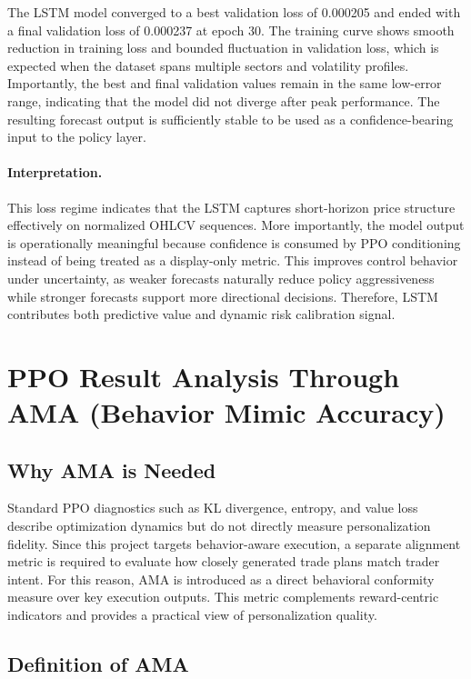 The LSTM model converged to a best validation loss of 0.000205 and ended with a final validation loss of 0.000237 at epoch 30. The training curve shows smooth reduction in training loss and bounded fluctuation in validation loss, which is expected when the dataset spans multiple sectors and volatility profiles. Importantly, the best and final validation values remain in the same low-error range, indicating that the model did not diverge after peak performance. The resulting forecast output is sufficiently stable to be used as a confidence-bearing input to the policy layer.

\paragraph{Interpretation.}
This loss regime indicates that the LSTM captures short-horizon price structure effectively on normalized OHLCV sequences. More importantly, the model output is operationally meaningful because confidence is consumed by PPO conditioning instead of being treated as a display-only metric. This improves control behavior under uncertainty, as weaker forecasts naturally reduce policy aggressiveness while stronger forecasts support more directional decisions. Therefore, LSTM contributes both predictive value and dynamic risk calibration signal.

\section{PPO Result Analysis Through AMA (Behavior Mimic Accuracy)}

\subsection{Why AMA is Needed}

Standard PPO diagnostics such as KL divergence, entropy, and value loss describe optimization dynamics but do not directly measure personalization fidelity. Since this project targets behavior-aware execution, a separate alignment metric is required to evaluate how closely generated trade plans match trader intent. For this reason, AMA is introduced as a direct behavioral conformity measure over key execution outputs. This metric complements reward-centric indicators and provides a practical view of personalization quality.

\subsection{Definition of AMA}

